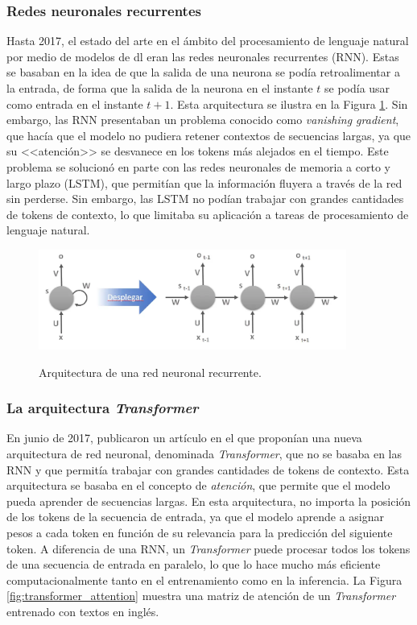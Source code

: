 \subsubsection{Redes neuronales recurrentes}
Hasta 2017, el estado del arte en el ámbito del procesamiento de lenguaje natural por medio de modelos de \gls{dl} eran las redes neuronales recurrentes (RNN). Estas se basaban en la idea de que la salida de una neurona se podía retroalimentar a la entrada, de forma que la salida de la neurona en el instante $t$ se podía usar como entrada en el instante $t+1$. Esta arquitectura se ilustra en la Figura \ref{fig:red_neuronal_recurrente}. Sin embargo, las RNN presentaban un problema conocido como \textit{vanishing gradient}, que hacía que el modelo no pudiera retener contextos de secuencias largas, ya que su <<atención>> se desvanece en los tokens más alejados en el tiempo. Este problema se solucionó en parte con las redes neuronales de memoria a corto y largo plazo (LSTM), que permitían que la información fluyera a través de la red sin perderse. Sin embargo, las LSTM no podían trabajar con grandes cantidades de tokens de contexto, lo que limitaba su aplicación a tareas de procesamiento de lenguaje natural.

\begin{figure}[H]
    \caption[Arquitectura de una red neuronal recurrente]{Arquitectura de una red neuronal recurrente.}
    \centering
    \includegraphics[width=0.9\textwidth]{./figuras/red_neuronal_recurrente.png}
    \label{fig:red_neuronal_recurrente}
\end{figure}


\subsubsection{La arquitectura \textit{Transformer}}
En junio de 2017, \citeauthor{vaswaniAttentionAllYou2017} publicaron un artículo \citep{vaswaniAttentionAllYou2017} en el que proponían una nueva arquitectura de red neuronal, denominada \textit{Transformer}, que no se basaba en las RNN y que permitía trabajar con grandes cantidades de tokens de contexto. Esta arquitectura se basaba en el concepto de \textit{atención}, que permite que el modelo pueda aprender de secuencias largas. En esta arquitectura, no importa la posición de los tokens de la secuencia de entrada, ya que el modelo aprende a asignar pesos a cada token en función de su relevancia para la predicción del siguiente token. A diferencia de una RNN, un \textit{Transformer} puede procesar todos los tokens de una secuencia de entrada en paralelo, lo que lo hace mucho más eficiente computacionalmente tanto en el entrenamiento como en la inferencia. La Figura \ref{fig:transformer_attention} muestra una matriz de atención de un \textit{Transformer} entrenado con textos en inglés.

